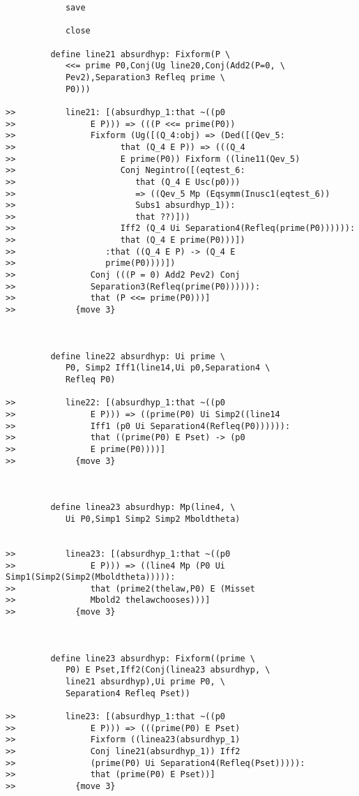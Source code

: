 \documentclass[12pt]{article}
\begin{document}
\begin{verbatim}
            save

            close

         define line21 absurdhyp: Fixform(P \
            <<= prime P0,Conj(Ug line20,Conj(Add2(P=0, \
            Pev2),Separation3 Refleq prime \
            P0)))

>>          line21: [(absurdhyp_1:that ~((p0
>>               E P))) => (((P <<= prime(P0))
>>               Fixform (Ug([(Q_4:obj) => (Ded([(Qev_5:
>>                     that (Q_4 E P)) => (((Q_4
>>                     E prime(P0)) Fixform ((line11(Qev_5)
>>                     Conj Negintro([(eqtest_6:
>>                        that (Q_4 E Usc(p0)))
>>                        => ((Qev_5 Mp (Eqsymm(Inusc1(eqtest_6))
>>                        Subs1 absurdhyp_1)):
>>                        that ??)]))
>>                     Iff2 (Q_4 Ui Separation4(Refleq(prime(P0)))))):
>>                     that (Q_4 E prime(P0)))])
>>                  :that ((Q_4 E P) -> (Q_4 E
>>                  prime(P0))))])
>>               Conj (((P = 0) Add2 Pev2) Conj
>>               Separation3(Refleq(prime(P0)))))):
>>               that (P <<= prime(P0)))]
>>            {move 3}



         define line22 absurdhyp: Ui prime \
            P0, Simp2 Iff1(line14,Ui p0,Separation4 \
            Refleq P0)

>>          line22: [(absurdhyp_1:that ~((p0
>>               E P))) => ((prime(P0) Ui Simp2((line14
>>               Iff1 (p0 Ui Separation4(Refleq(P0)))))):
>>               that ((prime(P0) E Pset) -> (p0
>>               E prime(P0))))]
>>            {move 3}



         define linea23 absurdhyp: Mp(line4, \
            Ui P0,Simp1 Simp2 Simp2 Mboldtheta)


>>          linea23: [(absurdhyp_1:that ~((p0
>>               E P))) => ((line4 Mp (P0 Ui Simp1(Simp2(Simp2(Mboldtheta))))):
>>               that (prime2(thelaw,P0) E (Misset
>>               Mbold2 thelawchooses)))]
>>            {move 3}



         define line23 absurdhyp: Fixform((prime \
            P0) E Pset,Iff2(Conj(linea23 absurdhyp, \
            line21 absurdhyp),Ui prime P0, \
            Separation4 Refleq Pset))

>>          line23: [(absurdhyp_1:that ~((p0
>>               E P))) => (((prime(P0) E Pset)
>>               Fixform ((linea23(absurdhyp_1)
>>               Conj line21(absurdhyp_1)) Iff2
>>               (prime(P0) Ui Separation4(Refleq(Pset))))):
>>               that (prime(P0) E Pset))]
>>            {move 3}




\end{verbatim}
\end{document}
